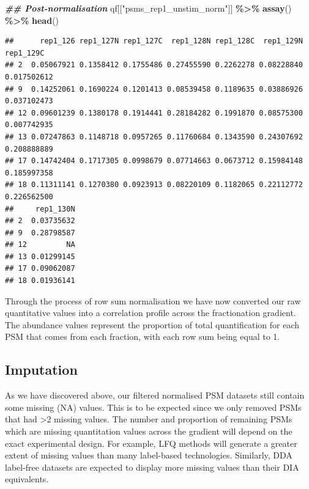 \documentclass[9pt,a4paper,]{extarticle}
\newenvironment{Shaded}{\begin{snugshade}}{\end{snugshade}}
\newcommand{\DocumentationTok}[1]{\textcolor[rgb]{0.56,0.35,0.01}{\textbf{\textit{#1}}}}
\newcommand{\FunctionTok}[1]{\textcolor[rgb]{0.13,0.29,0.53}{\textbf{#1}}}
\newcommand{\NormalTok}[1]{#1}
\newcommand{\SpecialCharTok}[1]{\textcolor[rgb]{0.81,0.36,0.00}{\textbf{#1}}}
\newcommand{\StringTok}[1]{\textcolor[rgb]{0.31,0.60,0.02}{#1}}
\begin{document}
\begin{Shaded}
\begin{Highlighting}[]
\DocumentationTok{\#\# Post{-}normalisation}
\NormalTok{qf[[}\StringTok{"psms\_rep1\_unstim\_norm"}\NormalTok{]] }\SpecialCharTok{\%\textgreater{}\%}
  \FunctionTok{assay}\NormalTok{() }\SpecialCharTok{\%\textgreater{}\%}
  \FunctionTok{head}\NormalTok{()}
\end{Highlighting}
\end{Shaded}

\begin{verbatim}
##      rep1_126 rep1_127N rep1_127C  rep1_128N rep1_128C  rep1_129N   rep1_129C
## 2  0.05067921 0.1358412 0.1755486 0.27455590 0.2262278 0.08228840 0.017502612
## 9  0.14252061 0.1690224 0.1201413 0.08539458 0.1189635 0.03886926 0.037102473
## 12 0.09601239 0.1380178 0.1914441 0.28184282 0.1991870 0.08575300 0.007742935
## 13 0.07247863 0.1148718 0.0957265 0.11760684 0.1343590 0.24307692 0.208888889
## 17 0.14742404 0.1717305 0.0998679 0.07714663 0.0673712 0.15984148 0.185997358
## 18 0.11311141 0.1270380 0.0923913 0.08220109 0.1182065 0.22112772 0.226562500
##     rep1_130N
## 2  0.03735632
## 9  0.28798587
## 12         NA
## 13 0.01299145
## 17 0.09062087
## 18 0.01936141
\end{verbatim}

Through the process of row sum normalisation we have now converted our raw
quantitative values into a correlation profile across the fractionation
gradient. The abundance values represent the proportion of total quantification
for each PSM that comes from each fraction, with each row sum being equal to 1.

\subsection{Imputation}\label{imputation}

As we have discovered above, our filtered normalised PSM datasets still contain
some missing (NA) values. This is to be expected since we only removed PSMs that
had \textgreater2 missing values. The number and proportion of remaining PSMs which are
missing quantitation values across the gradient will depend on the exact
experimental design. For example, LFQ methods will generate a greater extent of
missing values than many label-based technologies. Similarly, DDA label-free
datasets are expected to display more missing values than their DIA equivalents.
\end{document}
